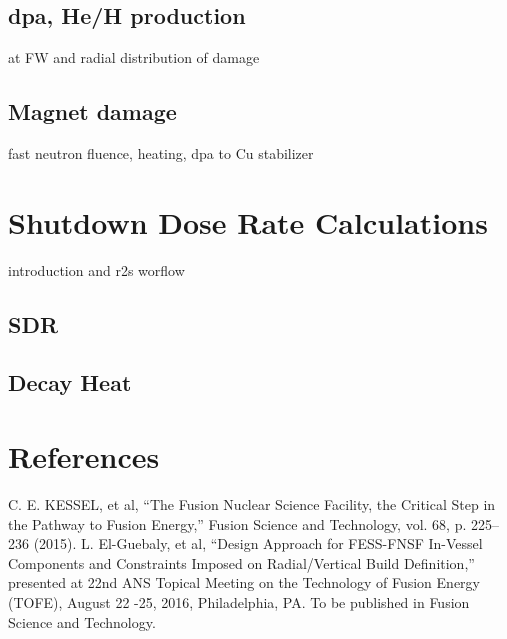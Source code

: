 \documentclass[12pt, letterpaper]{elsarticle}
\begin{document}
\subsection{dpa, He/H production}
at FW and radial distribution of damage
\subsection{Magnet damage}
fast neutron fluence, heating, dpa to Cu stabilizer

\section{Shutdown Dose Rate Calculations}
introduction and r2s worflow
\subsection{SDR}
\subsection{Decay Heat}

\newpage
\section{References}
\begin{thebibliography}{10} 
C. E. KESSEL, et al, {“The Fusion Nuclear Science Facility, the Critical Step in the Pathway to Fusion Energy,” Fusion Science and Technology, vol. 68, p. 225–236 (2015).}
L. El-Guebaly, et al, {“Design Approach for FESS-FNSF In-Vessel Components and Constraints Imposed on Radial/Vertical Build Definition,” presented at 22nd ANS Topical Meeting on the Technology of Fusion Energy (TOFE), August 22 -25, 2016, Philadelphia, PA. To be published in Fusion Science and Technology.}
\end{thebibliography}
\end{document}
